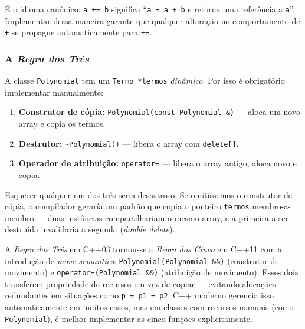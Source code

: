 \documentclass[11pt,a4paper]{article}
\begin{document}
\noindent \'E o idioma can\^onico: \texttt{a += b} significa ``\texttt{a = a + b} e retorne uma refer\^encia a \texttt{a}''. Implementar dessa maneira garante que qualquer altera\c{c}\~ao no comportamento de \texttt{+} se propague automaticamente para \texttt{+=}.

\subsubsection*{A \emph{Regra dos Tr\^es}}

A classe \texttt{Polynomial} tem um \texttt{Termo *termos} \emph{din\^amico}. Por isso \'e obrigat\'orio implementar manualmente:

\begin{enumerate}[leftmargin=*,itemsep=0pt]
  \item \textbf{Construtor de c\'opia:} \texttt{Polynomial(const Polynomial \&)} --- aloca um novo array e copia os termos.
  \item \textbf{Destrutor:} \texttt{\~{}Polynomial()} --- libera o array com \texttt{delete[]}.
  \item \textbf{Operador de atribui\c{c}\~ao:} \texttt{operator=} --- libera o array antigo, aloca novo e copia.
\end{enumerate}

Esquecer qualquer um dos tr\^es seria desastroso. Se omiti\'ssemos o construtor de c\'opia, o compilador gerar\'ia um padr\~ao que copia o ponteiro \texttt{termos} membro-a-membro --- duas inst\^ancias compartilhariam o mesmo array, e a primeira a ser destru\'ida invalidaria a segunda (\emph{double delete}).

\begin{obseng}
A \emph{Regra dos Tr\^es} em C++03 tornou-se a \emph{Regra dos Cinco} em C++11 com a introdu\c{c}\~ao de \emph{move semantics}: \texttt{Polynomial(Polynomial \&\&)} (construtor de movimento) e \texttt{operator=(Polynomial \&\&)} (atribui\c{c}\~ao de movimento). Esses dois transferem propriedade de recursos em vez de copiar --- evitando aloca\c{c}\~oes redundantes em situa\c{c}\~oes como \texttt{p = p1 + p2}. C++ moderno gerencia isso automaticamente em muitos casos, mas em classes com recursos manuais (como \texttt{Polynomial}), \'e melhor implementar as cinco fun\c{c}\~oes explicitamente.
\end{obseng}
\end{document}
